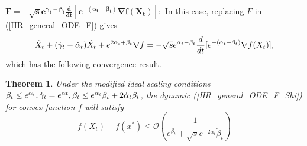 \documentclass{article}
\theoremstyle{plain}
\newtheorem{thm}{\textbf{Theorem}}
\theoremstyle{definition}
\theoremstyle{remark}
\begin{document}
     $ \boldsymbol{F = -\sqrt{s}e^{\gamma_t-\beta_t}\frac{d}{dt}\left[e^{-(\alpha_t-\beta_t)}\nabla f(X_t)\right]}:$
    In this case, replacing $F$ in (\ref{HR_general_ODE_F}) gives
    \begin{align}\label{HR_general_ODE_F_Shi}
    \Ddot{X}_t + (\dot{\gamma}_t-\dot{\alpha}_t)\dot{X}_t+e^{2\alpha_t+\beta_t}\nabla f = -\sqrt{s}e^{\alpha_t-\beta_t}\frac{d}{dt}[e^{-(\alpha_t-\beta_t)}\nabla f(X_t)],
\end{align}
which has the following convergence result.
\begin{thm}\label{Theorem_ODE_Shi}
Under the modified ideal scaling conditions $\dot\beta_t\leq e^{\alpha_t}, \dot\gamma_t=e^{\alpha t}, \Ddot{\beta}_t\leq e^{\alpha_t}\dot \beta_t + 2\dot \alpha_t \dot \beta_t$, the dynamic (\ref{HR_general_ODE_F_Shi}) for convex function $f$ will satisfy 
$$f(X_t)-f(x^*)\leq \mathcal{O}(\frac{1}{e^{\beta_t}+\sqrt{s}e^{-2\alpha_t}\dot \beta_t})$$
\end{thm}
\end{document}
